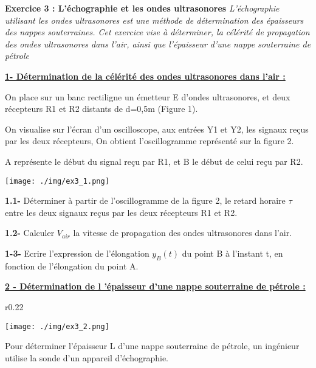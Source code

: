 \documentclass[12pt, french]{article}
\begin{document}
	  \vspace{-0.5cm}
  \begin{Box2}{\textbf{Exercice 3 :  L’échographie et les ondes ultrasonores  }}
\emph{L’échographie utilisant les ondes ultrasonores est une méthode de détermination des épaisseurs
des nappes souterraines.
Cet exercice vise à déterminer, la célérité de propagation des ondes ultrasonores dans l’air,
ainsi que l’épaisseur d’une nappe souterraine de pétrole}

\underline{\textbf{1- Détermination de la célérité des ondes ultrasonores dans l’air :}}

On place sur un banc rectiligne un émetteur E d’ondes ultrasonores, et deux récepteurs R1 et R2
distants de d=0,5m (Figure 1).

On visualise sur l’écran d’un oscilloscope, aux entrées Y1 et Y2, les signaux reçus par les deux
récepteurs, On obtient l’oscillogramme représenté sur la figure 2.

A représente le début du signal reçu par R1, et B le début de celui reçu par R2.

  \begin{center}
	  \vspace{-0.5cm}
	\texttt{[image: ./img/ex3\_1.png]}
  \end{center}

  \textbf{1.1- }Déterminer à partir de l’oscillogramme de la figure 2, le retard horaire $\tau$ entre les deux
signaux reçus par les deux récepteurs R1 et R2.

\textbf{1.2- }Calculer $V_{air}$ la vitesse de propagation des ondes ultrasonores dans l’air.

\textbf{1-3- }Ecrire l’expression de l’élongation $y_B(t)$ du point B à l’instant t, en fonction de l’élongation du point A.

\underline{\textbf{2 - Détermination de l ’épaisseur d’une nappe souterraine de pétrole :}}

\begin{wrapfigure}[8]{r}{0.22\textwidth}
  \begin{center}
	  \vspace{-1.5cm}
	\texttt{[image: ./img/ex3\_2.png]}
  \end{center}
\end{wrapfigure}


Pour déterminer l’épaisseur L d’une nappe souterraine de
pétrole, un ingénieur utilise la sonde d’un appareil
d’échographie.


\end{Box2}
\end{document}
